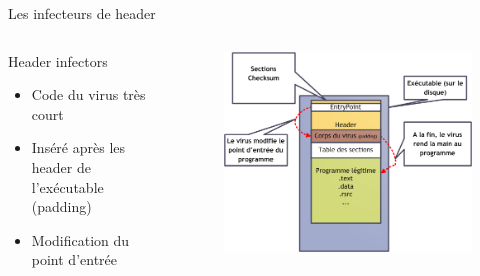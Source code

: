 \documentclass{beamer}
\begin{document}
\begin{frame}{Les infecteurs de header}
\begin{columns}[t]
\begin{column}{4cm}
\begin{exampleblock}{Header infectors}
\begin{itemize}
\item Code du virus très court
\item Inséré après les header de l'exécutable (padding)
\item Modification du point d'entrée
\end{itemize}
\end{exampleblock}
\end{column}
\begin{column}{6cm}
\begin{figure}[!ht]
\includegraphics[scale=0.3]{header.png}
\center
\end{figure}
\end{column}
\end{columns}

\end{frame}
\end{document}
